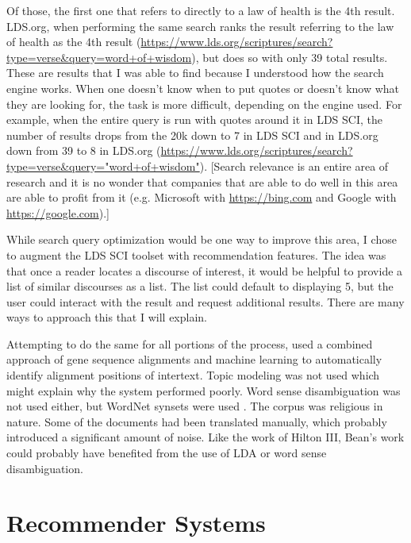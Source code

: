 Of those, the first one that refers to directly to a law of health is the 4th result. LDS.org, when performing the same search ranks the result referring to the law of health as the 4th result (\url{https://www.lds.org/scriptures/search?type=verse&query=word+of+wisdom}), but does so with only 39 total results. These are results that I was able to find because I understood how the search engine works. When one doesn’t know when to put quotes or doesn’t know what they are looking for, the task is more difficult, depending on the engine used. For example, when the entire query is run with quotes around it in LDS SCI, the number of results drops from the 20k down to 7 in LDS SCI and in LDS.org down from 39 to 8 in LDS.org (\url{https://www.lds.org/scriptures/search?type=verse&query="word+of+wisdom"}). [Search relevance is an entire area of research and it is no wonder that companies that are able to do well in this area are able to profit from it (e.g. Microsoft with \url{https://bing.com} and Google with \url{https://google.com}).]

While search query optimization would be one way to improve this area, I chose to augment the LDS SCI toolset with recommendation features. The idea was that once a reader locates a discourse of interest, it would be helpful to provide a list of similar discourses as a list. The list could default to displaying 5, but the user could interact with the result and request additional results. There are many ways to approach this that I will explain.

Attempting to do the same for all portions of the process, \citeauthor{bean5-plagiarism-detection} used a combined approach of gene sequence alignments and machine learning to automatically identify alignment positions of intertext. Topic modeling was not used which might explain why the system performed poorly. Word sense disambiguation was not used either, but WordNet synsets were used \citep{wordnet_1998}. The corpus was religious in nature. Some of the documents had been translated manually, which probably introduced a significant amount of noise. Like the work of Hilton III, Bean’s work could probably have benefited from the use of LDA or word sense disambiguation.

\section{Recommender Systems}

